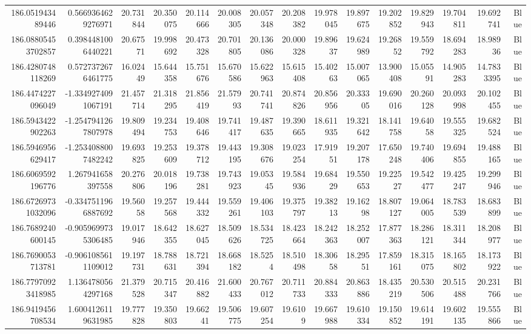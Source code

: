 \begin{center}
\begin{longtable}{rrrrrrrrrrrrrrr}
186.051943489446 & 0.5669364629276971 & 20.731844 & 20.350075 & 20.114666 & 20.008305 & 20.057348 & 20.208382 & 19.978045 & 19.897675 & 19.202852 & 19.829943 & 19.704811 & 19.692741 & Blue \\
186.08805453702857 & 0.3984481006440221 & 20.67571 & 19.998692 & 20.473328 & 20.701805 & 20.136086 & 20.000328 & 19.89637 & 19.624989 & 19.26852 & 19.559792 & 18.694283 & 18.98936 & Blue \\
186.4280748118269 & 0.5727372676461775 & 16.02449 & 15.644358 & 15.751676 & 15.670586 & 15.622963 & 15.615408 & 15.40263 & 15.007065 & 13.900408 & 15.05591 & 14.905283 & 14.7833395 & Blue \\
186.4474227096049 & -1.3349274091067191 & 21.457714 & 21.318295 & 21.856419 & 21.57993 & 20.741741 & 20.874826 & 20.856956 & 20.33305 & 19.690016 & 20.260128 & 20.093998 & 20.102455 & Blue \\
186.5943422902263 & -1.2547941267807978 & 19.809494 & 19.234753 & 19.408646 & 19.741417 & 19.487635 & 19.390665 & 18.611935 & 19.321642 & 18.141758 & 19.64058 & 19.555325 & 19.682524 & Blue \\
186.5946956629417 & -1.2534088007482242 & 19.693825 & 19.253609 & 19.378712 & 19.443195 & 19.308676 & 19.023254 & 17.91951 & 19.207178 & 17.650248 & 19.740406 & 19.694855 & 19.488165 & Blue \\
186.6069592196776 & 1.267941658397558 & 20.276806 & 20.018196 & 19.738281 & 19.743923 & 19.05345 & 19.584936 & 19.68429 & 19.550653 & 19.22527 & 19.542477 & 19.425247 & 19.299946 & Blue \\
186.67269731032096 & -0.3347511966887692 & 19.56058 & 19.257568 & 19.444332 & 19.559261 & 19.406103 & 19.375797 & 19.38213 & 19.16298 & 18.807127 & 19.064005 & 18.783539 & 18.683899 & Blue \\
186.7689240600145 & -0.9059699735306485 & 19.017946 & 18.642355 & 18.627045 & 18.509626 & 18.534725 & 18.423664 & 18.242363 & 18.252007 & 17.877363 & 18.286121 & 18.311344 & 18.208977 & Blue \\
186.7690053713781 & -0.9061085611109012 & 19.197731 & 18.788631 & 18.721394 & 18.668182 & 18.5254 & 18.510498 & 18.30658 & 18.29551 & 17.859161 & 18.315075 & 18.165802 & 18.173922 & Blue \\
186.77970923418985 & 1.1364780564297168 & 21.379528 & 20.715347 & 20.416882 & 21.600433 & 20.767012 & 20.711733 & 20.884333 & 20.863886 & 18.435219 & 20.530506 & 20.515488 & 20.231766 & Blue \\
186.9419456708534 & 1.6004126119631985 & 19.777828 & 19.350803 & 19.66241 & 19.506775 & 19.607254 & 19.6109 & 19.667988 & 19.610334 & 19.150852 & 19.614191 & 19.602135 & 19.555866 & Blue \\

\end{longtable}
\end{center}

